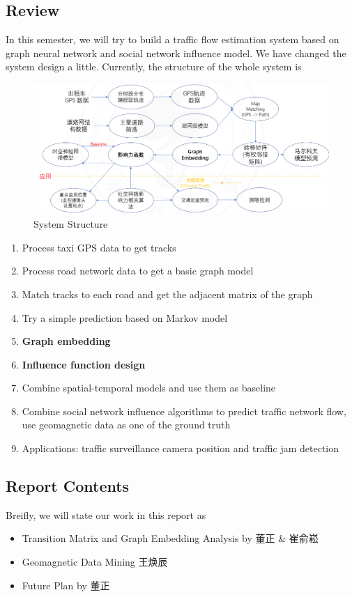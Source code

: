 \documentclass[fontset=none]{ctexart}
\theoremstyle{definition}
\theoremstyle{remark}
\begin{document}
\subsection{Review}
In this semester, we will try to build a traffic flow estimation system based on graph neural network and
social network influence model. We have changed the system design a little.
Currently, the structure of the whole system is

\begin{figure}[htb]
  \centering
  \includegraphics[width=\textwidth]{images/8-1-1.png}
  \caption{System Structure}
  \label{fig: structure}
\end{figure}

\begin{enumerate}
  \item Process taxi GPS data to get tracks
  \item Process road network data to get a basic graph model
  \item Match tracks to each road and get the adjacent matrix of the graph
  \item Try a simple prediction based on Markov model
  \item \textbf{Graph embedding}
  \item \textbf{Influence function design}
  \item Combine spatial-temporal models and use them as baseline
  \item Combine social network influence algorithms to predict traffic network flow, use geomagnetic data as one of the ground truth
  \item Applications: traffic surveillance camera position and traffic jam detection
\end{enumerate}

\subsection{Report Contents}
Breifly, we will state our work in this report as
\begin{itemize}
  \item Transition Matrix and Graph Embedding Analysis by 董正 \& 崔俞崧
  \item Geomagnetic Data Mining 王焕辰
  \item Future Plan by 董正
\end{itemize}
\end{document}
